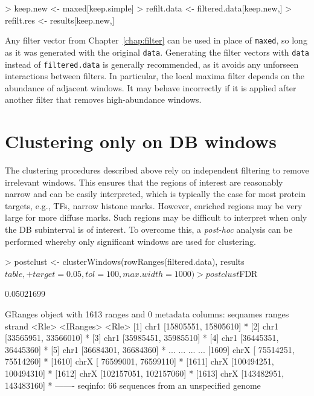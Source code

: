 \documentclass[12pt]{report}
\renewenvironment{Schunk}{\vspace{0pt}}{\vspace{0pt}}
\newcommand{\code}[1]{{\small\texttt{#1}}}
\begin{document}
\begin{Schunk}
\begin{Sinput}
> keep.new <- maxed[keep.simple]
> refilt.data <- filtered.data[keep.new,]
> refilt.res <- results[keep.new,]
\end{Sinput}
\end{Schunk}

Any filter vector from Chapter~\ref{chap:filter} can be used in place of \code{maxed}, so long as it was generated with the original \code{data}.
Generating the filter vectors with \code{data} instead of \code{filtered.data} is generally recommended, as it avoids any unforseen interactions between filters.
In particular, the local maxima filter depends on the abundance of adjacent windows.
It may behave incorrectly if it is applied after another filter that removes high-abundance windows.

\section{Clustering only on DB windows}
The clustering procedures described above rely on independent filtering to remove irrelevant windows.
This ensures that the regions of interest are reasonably narrow and can be easily interpreted, 
    which is typically the case for most protein targets, e.g., TFs, narrow histone marks.
However, enriched regions may be very large for more diffuse marks.
Such regions may be difficult to interpret when only the DB subinterval is of interest.
To overcome this, a \textit{post-hoc} analysis can be performed whereby only significant windows are used for clustering.

\begin{Schunk}
\begin{Sinput}
> postclust <- clusterWindows(rowRanges(filtered.data), results$table,
+     target=0.05, tol=100, max.width=1000)
> postclust$FDR
\end{Sinput}
\begin{Soutput}
[1] 0.05021699
\end{Soutput}
\begin{Soutput}
GRanges object with 1613 ranges and 0 metadata columns:
         seqnames                 ranges strand
            <Rle>              <IRanges>  <Rle>
     [1]     chr1   [15805551, 15805610]      *
     [2]     chr1   [33565951, 33566010]      *
     [3]     chr1   [35985451, 35985510]      *
     [4]     chr1   [36445351, 36445360]      *
     [5]     chr1   [36684301, 36684360]      *
     ...      ...                    ...    ...
  [1609]     chrX [ 75514251,  75514260]      *
  [1610]     chrX [ 76599001,  76599110]      *
  [1611]     chrX [100494251, 100494310]      *
  [1612]     chrX [102157051, 102157060]      *
  [1613]     chrX [143482951, 143483160]      *
  -------
  seqinfo: 66 sequences from an unspecified genome
\end{Soutput}
\end{Schunk}
\end{document}
